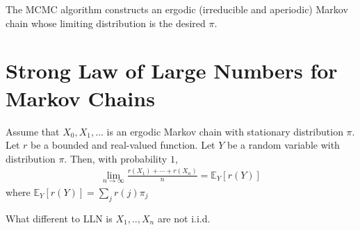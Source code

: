 \documentclass[11pt]{elegantbook}
\begin{document}
The MCMC algorithm constructs an ergodic (irreducible and aperiodic) Markov chain whose limiting distribution is the desired $\pi$.

\section{Strong Law of Large Numbers for Markov Chains}
\begin{theorem}
    Assume that $X_0,X_1,...$ is an ergodic Markov chain  with stationary distribution $\pi$. Let $r$ be a bounded and real-valued function. Let $Y$ be a random variable with distribution $\pi$. Then, with probability $1$,
    \begin{equation}
        \begin{aligned}
            \lim_{n \rightarrow \infty}\frac{r(X_1)+\cdots+r(X_n)}{n}=\mathbb{E}_Y[r(Y)]
        \end{aligned}
        \nonumber
    \end{equation}
    where $\mathbb{E}_Y[r(Y)]=\sum_{j}r(j)\pi_j$
\end{theorem}
What different to LLN is $X_1,..,X_n$ are not i.i.d.
\end{document}
